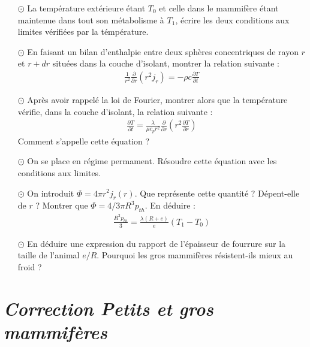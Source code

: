 \documentclass{report}
\begin{document}
\begin{itemize}

	\item[$\odot$] La température extérieure étant $T_{0}$ et celle dans le mammifère étant maintenue dans tout son métabolisme à $T_1$, écrire les deux conditions aux limites vérifiées par la témpérature.
	
	\item[$\odot$] En faisant un bilan d'enthalpie entre deux sphères concentriques de rayon $r$ et $r+dr$ situées dans la couche d'isolant, montrer la relation suivante :
	\begin{align*}
		\frac{1}{r^2}\frac{\partial }{\partial r}\left( r^2j_r\right) =-\rho c\frac{\partial T}{\partial t}
	\end{align*}
	
	\item[$\odot$] Après avoir rappelé la loi de Fourier, montrer alors que la température vérifie, dans la couche d'isolant, la relation suivante :
	\begin{align*}
		\frac{\partial T}{\partial t}=\frac{\lambda}{\mu c_p r^2}\frac{\partial }{\partial r}\left( r^2\frac{\partial T}{\partial r}\right) 	
	\end{align*}
	Comment s'appelle cette équation ?

	\item[$\odot$] On se place en régime permament. Résoudre cette équation avec les conditions aux limites.
	
	\item[$\odot$] On introduit $\Phi=4\pi r^2j_r(r)$. Que représente cette quantité ? Dépent-elle de $r$ ? Montrer que $\Phi=4/3\pi R^3p_{th}$. En déduire :
	\begin{align*}
		\frac{R^2p_{th}}{3}=\frac{\lambda (R+e)}{e}(T_1-T_0)
	\end{align*}
	
	\item[$\odot$] En déduire une expression du rapport de l'épaisseur de fourrure sur la taille de l'animal $e/R$. Pourquoi les gros mammifères résistent-ils mieux au froid ?

\end{itemize}

\newpage

\section*{\textit{Correction Petits et gros mammifères}}
\end{document}
